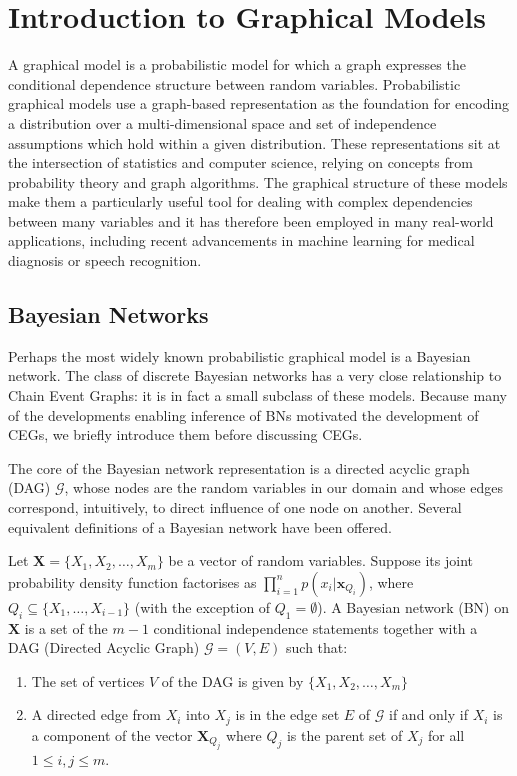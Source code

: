 \documentclass[runningheads]{llncs}
\begin{document}
\section{Introduction to Graphical Models}\label{subsec:graphicalintro}
A graphical model is a probabilistic model for which a graph expresses the conditional dependence structure between random variables. Probabilistic graphical models use a graph-based representation as the foundation for encoding a distribution over a multi-dimensional space and set of independence assumptions which hold within a given distribution. These representations sit at the intersection of statistics and computer science, relying on concepts from probability theory and graph algorithms. The graphical structure of these models make them a particularly useful tool for dealing with complex dependencies between many variables and it has therefore been employed in many real-world applications, including recent advancements in machine learning for medical diagnosis or speech recognition.

\subsection{Bayesian Networks}\label{subsec:bayesiannetworks}
Perhaps the most widely known probabilistic graphical model is a Bayesian network. The class of discrete Bayesian networks has a very close relationship to Chain Event Graphs: it is in fact a small subclass of these models. Because many of the developments enabling inference of BNs motivated the development of CEGs, we briefly introduce them before discussing CEGs. 

The core of the Bayesian network representation is a directed acyclic graph (DAG) $\mathcal{G}$, whose nodes are the random variables in our domain and whose edges correspond, intuitively, to direct influence of one node on another. Several equivalent definitions of a Bayesian network have been offered.

\begin{definition}
Let $\boldsymbol{X} = \{X_1, X_2, \ldots, X_m\}$ be a vector of random variables. Suppose its joint probability density function factorises as $\prod_ {i=1}^{n} p(x_i | \boldsymbol{x}_{Q_i})$, where $Q_i \subseteq \{X_1,\ldots,X_{i-1}\}$ (with the exception of $Q_1 = \emptyset$). A Bayesian network (BN) on $\boldsymbol{X}$ is a set of the $m - 1$ conditional independence statements together with a DAG (Directed Acyclic Graph) $\mathcal{G} = (V, E)$ such that:
\begin{enumerate}[topsep=0pt]
    \item The set of vertices $V$ of the DAG is given by $\{X_1, X_2, \ldots, X_m\}$
    \item A directed edge from $X_i$ into $X_j$ is in the edge set $E$ of $\mathcal{G}$ if and only if $X_i$ is a component of the vector $\boldsymbol{X}_{Q_j}$ where $Q_j$ is the parent set of $X_j$ for all $1 \leq i, j \leq m$.
\end{enumerate}
\end{definition}
\end{document}
